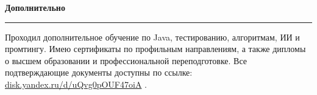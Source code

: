 \documentclass[a4paper,10pt]{article}
\newcommand{\resumeSection}[1]{%
    \par
    \vspace{6pt}%
    {\fontsize{13}{14}\selectfont
     \bfseries
     \color{accent}
     #1\par}%
    \vspace{-8pt}%
    {\color{accent}\noindent\rule{\textwidth}{0.5pt}\par}%
    \vspace{2pt}%
}
\newcommand{\visibleLink}[2]{%
    \href{#1}{\textcolor{accent}{#2}}%
}
\begin{document}
\resumeSection{Дополнительно}

{\fontsize{9.2}{10.4}\selectfont
Проходил дополнительное обучение по Java, тестированию, алгоритмам,
ИИ и промтингу. Имею сертификаты по профильным направлениям, а также дипломы
о высшем образовании и профессиональной переподготовке. Все подтверждающие
документы доступны по ссылке:
\visibleLink
{https://disk.yandex.ru/d/uQvg0pOUF47oiA}
{disk.yandex.ru/d/uQvg0pOUF47oiA}.
}
\end{document}
